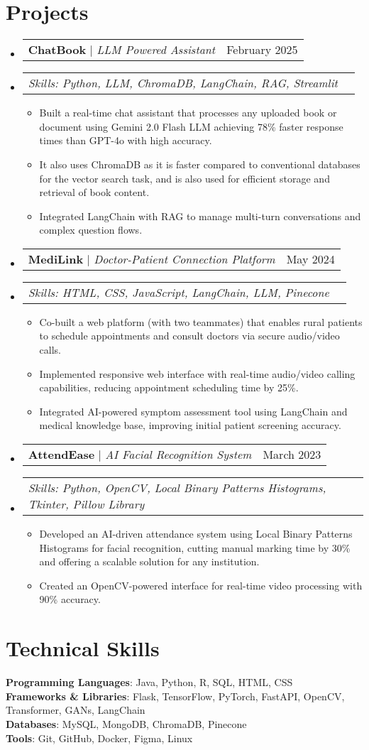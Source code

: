 \documentclass[letterpaper,11pt]{article}
\makeatletter
\newcommand{\resumeItem}[1]{
  \item\small{
    {#1 \vspace{-2pt}}
  }
}
\newcommand{\resumeProjectHeading}[2]{
    \item
    \begin{tabular*}{0.97\textwidth}{l@{\extracolsep{\fill}}r}
      \small#1 & #2 \\
    \end{tabular*}\vspace{-7pt}
}
\newcommand{\projectSkills}[1]{
    \item
    \begin{tabular*}{0.97\textwidth}{l@{\extracolsep{\fill}}r}
      \small\textit{Skills: #1} & \\
    \end{tabular*}\vspace{-7pt}
}
\newcommand{\resumeSubHeadingListStart}{\begin{itemize}[leftmargin=0.15in, label={}]}
\newcommand{\resumeSubHeadingListEnd}{\end{itemize}}
\newcommand{\resumeItemListStart}{\begin{itemize}}
\newcommand{\resumeItemListEnd}{\end{itemize}\vspace{-5pt}}
\makeatother
\begin{document}
\section{Projects}
    \resumeSubHeadingListStart
      \resumeProjectHeading
          {\textbf{ChatBook} $|$ \emph{LLM Powered Assistant}}{February 2025}
      \projectSkills{Python, LLM, ChromaDB, LangChain, RAG, Streamlit}
      \resumeItemListStart
        \resumeItem{Built a real-time chat assistant that processes any uploaded book or document using Gemini 2.0 Flash LLM achieving 78\% faster response times than GPT-4o with high accuracy.}
        \resumeItem{It also uses ChromaDB as it is faster compared to conventional databases for the vector search task, and is also used for efficient storage and retrieval of book content.}
        \resumeItem{Integrated LangChain with RAG to manage multi-turn conversations and complex question flows.}
      \resumeItemListEnd
      \resumeProjectHeading
          {\textbf{MediLink} $|$ \emph{Doctor-Patient Connection Platform}}{May 2024}
      \projectSkills{HTML, CSS, JavaScript, LangChain, LLM, Pinecone}
      \resumeItemListStart
        \resumeItem{Co-built a web platform (with two teammates) that enables rural patients to schedule appointments and consult doctors via secure audio/video calls.}
        \resumeItem{Implemented responsive web interface with real-time audio/video calling capabilities, reducing appointment scheduling time by 25\%.}
        \resumeItem{Integrated AI-powered symptom assessment tool using LangChain and medical knowledge base, improving initial patient screening accuracy.}
      \resumeItemListEnd
      \resumeProjectHeading
          {\textbf{AttendEase} $|$ \emph{AI Facial Recognition System}}{March 2023}
      \projectSkills{Python, OpenCV, Local Binary Patterns Histograms, Tkinter, Pillow Library}
      \resumeItemListStart
        \resumeItem{Developed an AI-driven attendance system using Local Binary Patterns Histograms for facial recognition, cutting manual marking time by 30\% and offering a scalable solution for any institution.}
        \resumeItem{Created an OpenCV-powered interface for real-time video processing with 90\% accuracy.}
      \resumeItemListEnd
    \resumeSubHeadingListEnd

\section{Technical Skills}
 \begin{itemize}[leftmargin=0.15in, label={}]
    \small{\item{
     \textbf{Programming Languages}{: Java, Python, R, SQL, HTML, CSS} \\
     \textbf{Frameworks \& Libraries}{: Flask, TensorFlow, PyTorch, FastAPI, OpenCV, Transformer, GANs, LangChain } \\
     \textbf{Databases}{: MySQL, MongoDB, ChromaDB, Pinecone} \\
     \textbf{Tools}{: Git, GitHub, Docker, Figma, Linux}
    }}
 \end{itemize}
\end{document}
